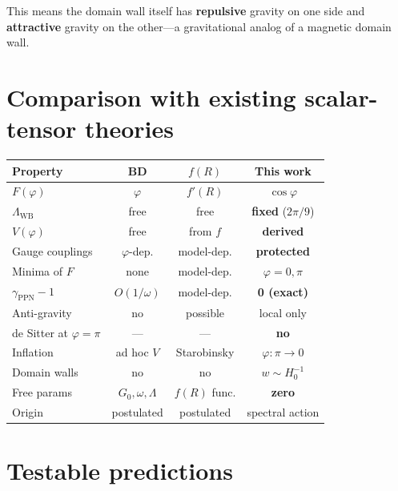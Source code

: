 \documentclass[aps,prd,twocolumn,superscriptaddress,nofootinbib]{revtex4-2}
\newcommand{\Lw}{\Lambda_{\mathrm{WB}}}
\begin{document}
This means the domain wall itself has
\textbf{repulsive} gravity on one side and
\textbf{attractive} gravity on the other---a
gravitational analog of a magnetic domain wall.


\section{Comparison with existing scalar-tensor theories}
\label{sec:comparison}

\begin{center}
\begin{tabular}{lccc}
\toprule
Property & BD & $f(R)$ & This work \\
\midrule
$F(\varphi)$ & $\varphi$ & $f'(R)$ & $\cos\varphi$ \\
$\Lw$ & free & free & \textbf{fixed} ($2\pi/9$) \\
$V(\varphi)$ & free & from $f$ & \textbf{derived} \\
Gauge couplings & $\varphi$-dep. & model-dep.
  & \textbf{protected} \\
Minima of $F$ & none & model-dep. & $\varphi = 0, \pi$ \\
$\gamma_{\mathrm{PPN}}-1$ & $O(1/\omega)$ & model-dep.
  & \textbf{0 (exact)} \\
Anti-gravity & no & possible & local only \\
de Sitter at $\varphi\!=\!\pi$ & --- & --- & \textbf{no} \\
Inflation & ad hoc $V$ & Starobinsky & $\varphi: \pi \to 0$ \\
Domain walls & no & no & $w \sim H_0^{-1}$ \\
Free params & $G_0, \omega, \Lambda$
  & $f(R)$ func. & \textbf{zero} \\
Origin & postulated & postulated & spectral action \\
\bottomrule
\end{tabular}
\end{center}


\section{Testable predictions}
\label{sec:predictions}
\end{document}
